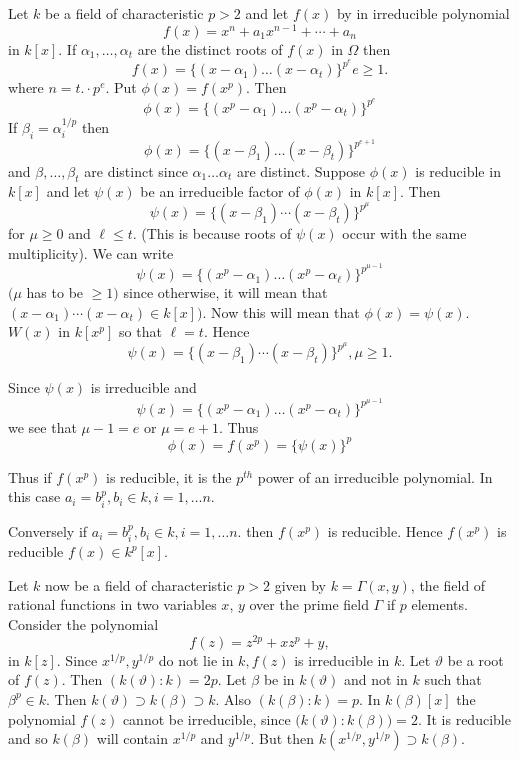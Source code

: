 Let $k$ be a field of characteristic $p > 2$ and let $f(x)$ by in
irreducible polynomial  
$$
f(x) = x^n + a_1 x^{ n -1} + \cdots + a_n
$$
in $k[x]$. If $\alpha_1, \ldots , \alpha_t$ are the distinct roots of
$f(x)$ in $\Omega$ then  
$$
f (x) = \Big\{ (x - \alpha_1 ) \ldots  (x - \alpha_t )\Big\}^{p^e}
e\geq 1. 
$$
where $n = t. \cdot p^e$. Put $\phi (x) = f(x^p)$. Then
$$
\phi (x) = \big\{ (x^p - \alpha_1) \ldots (x^p - \alpha_t)\}^{p^e} 
$$
If $\beta_i = \alpha_i^{ 1/p}$ then 
$$
\phi (x) =\big\{ (x - \beta_1) \ldots (x - \beta_t)\big\}^{ p^{e+1}}  
$$
and $\beta, \ldots , \beta_t$ are distinct since $\alpha_1 \ldots
\alpha_t$ are distinct. Suppose $\phi (x)$ is reducible in $k[x]$ and
let $\psi (x)$ be an irreducible factor of $\phi (x)$  in $k[x]$. Then  
$$
\psi (x) = \Big\{  (x - \beta_1) \cdots (x - \beta _t)\Big\}^{p^\mu}
$$
for $\mu \geq 0$ and $\ell \leq t$. (This is because roots of $\psi
(x)$ occur with the same multiplicity). We can write  
$$
\psi (x) = \big\{ (x^p - \alpha_1)\ldots (x^p - \alpha_\ell)\big\}^{p^{ \mu -1}}
$$
$(\mu$ has to be $\geq 1)$ since otherwise, it will mean that $(x -
\alpha_1) \cdots (x - \alpha_t) \in k [x])$. Now this will mean that
$\phi (x) = \psi (x)$. $W(x)$ in $ k [ x^p]$ so that $\ell = t$. Hence  
$$
\psi (x) = \{ (x - \beta_1) \cdots (x - \beta_t) \} ^{p^\mu}, \mu \geq 1.
$$\pageoriginale

Since $\psi (x)$ is irreducible and
$$
\psi (x) = \{ (x^p - \alpha_1) \ldots (x ^p - \alpha_t) \} ^{p^{\mu-1}} 
$$
we see that $\mu -1 =e $ or $\mu = e + 1$. Thus
$$
\phi (x) = f(x^p) = \{ \psi (x) \}^p
$$

Thus if $f(x^p)$ is reducible, it is the $p^{th}$ power of an
irreducible polynomial. In this case $a_i = b^p_i, b_i \in k, i = 1,
\ldots n$. 

Conversely if $a_i = b^p_i , b_i \in k, i = 1, \ldots n$. then
$f(x^p)$ is reducible. Hence $f(x^p)$ is reducible $ f(x) \in k^p
[x]$. 

Let $k$ now be a field of characteristic $p > 2$ given by $k = \Gamma
(x , y)$, the field of rational functions in two variables $x$, $y$ over
the prime field $\Gamma$ if $p$ elements. Consider the polynomial  
$$
f(z) = z^{2p} + x z^{p} + y,
$$
in $k[z]$. Since $x^{1/p} , y^{1/p}$ do not lie in $k,f(z)$ is
irreducible in $k$. Let $\vartheta$ be a root of $f(z)$. Then
$(k(\vartheta):k) = 2p$. Let $\beta$ be in $k(\vartheta)$ and not in
$k$ such that $\beta^p \in k$. Then $k(\vartheta) \supset k(\beta)
\supset k$. Also $(k(\beta) : k) = p$. In $k(\beta)[x]$ the polynomial
$f(z)$ cannot be irreducible, since $\big( k (\vartheta) : k( \beta
)\big ) = 2$. It is reducible and so $k(\beta)$ will contain $x^{1/p}$
and $y^{1/p}$. But then $k(x^{1/p} , y^{1/p}) \supset k(\beta)$.  

